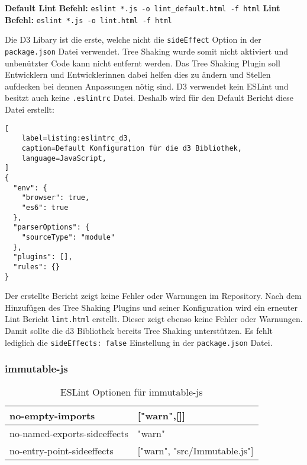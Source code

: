 \begin{center}
\textbf{Default Lint Befehl:} \lstinline{eslint *.js -o lint_default.html -f html} \linebreak 
\textbf{Lint Befehl:} \lstinline{eslint *.js -o lint.html -f html}
\end{center}

Die D3 Libary ist die erste, welche nicht die \lstinline{sideEffect} Option in der \lstinline{package.json} Datei verwendet. Tree Shaking wurde somit nicht aktiviert und unbenützter Code kann nicht entfernt werden. Das Tree Shaking Plugin soll Entwicklern und Entwicklerinnen dabei helfen dies zu ändern und Stellen aufdecken bei dennen Anpassungen nötig sind. D3 verwendet kein ESLint und besitzt auch keine \lstinline{.eslintrc} Datei. Deshalb wird für den Default Bericht diese Datei erstellt:

\begin{lstlisting}[
    label=listing:eslintrc_d3,
	caption=Default Konfiguration für die d3 Bibliothek,
	language=JavaScript,
]
{
  "env": {
    "browser": true,
    "es6": true
  },
  "parserOptions": {
    "sourceType": "module"
  },
  "plugins": [],
  "rules": {}
}
\end{lstlisting}

Der erstellte Bericht zeigt keine Fehler oder Warnungen im Repository. Nach dem Hinzufügen des Tree Shaking Plugins und seiner Konfiguration wird ein erneuter Lint Bericht \lstinline{lint.html} erstellt. Dieser zeigt ebenso keine Fehler oder Warnungen. Damit sollte die d3 Bibliothek bereits Tree Shaking unterstützen. Es fehlt lediglich die \lstinline{sideEffects: false} Einstellung in der \lstinline{package.json} Datei.

\subsubsection{immutable-js}
\begin{table}[H]
\centering
\caption{ESLint Optionen für immutable-js}
\label{tbl:immutable-options}
\begin{tabular}{|l|l|}
\hline
no-empty-imports             & {[}"warn",{[}{]}{]}         \\ \hline
no-named-exports-sideeffects & "warn"                      \\ \hline
no-entry-point-sideeffects   & {[}"warn", "src/Immutable.js"{]} \\ \hline
\end{tabular}
\end{table}

